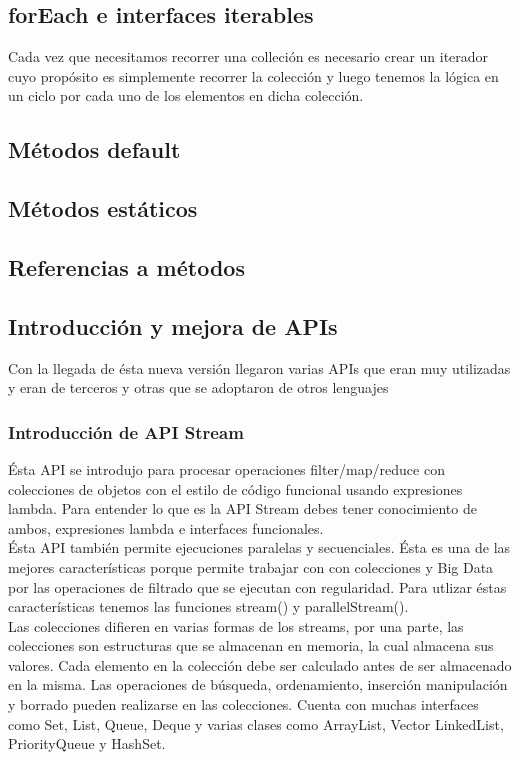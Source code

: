 \documentclass[12pt,article,oneside]{memoir}
\begin{document}
			\subsection{forEach e interfaces iterables} 
			Cada vez que necesitamos recorrer una colleci\'on es necesario crear un iterador cuyo prop\'osito es simplemente 
			recorrer la colecci\'on y luego tenemos la l\'ogica en un ciclo por cada uno de los elementos en dicha colecci\'on.
			
			\subsection{M\'etodos default}
			
			\subsection{M\'etodos est\'aticos}
			
			\subsection{Referencias a m\'etodos}
			
			\subsection{Introducci\'on y mejora de APIs}
			Con la llegada de \'esta nueva versi\'on llegaron varias APIs que eran muy utilizadas y eran de terceros y otras
			que se adoptaron de otros lenguajes
				\subsubsection{Introducci\'on de API Stream}
				\'Esta API se introdujo para procesar operaciones filter/map/reduce con colecciones de objetos con el estilo 
				de c\'odigo funcional usando expresiones lambda. Para entender lo  que es la API Stream debes tener conocimiento 
				de ambos, expresiones lambda e interfaces funcionales.\\
				
				\'Esta API tambi\'en permite ejecuciones paralelas y secuenciales. \'Esta es una de las mejores caracter\'isticas 
				porque permite trabajar con con colecciones y Big Data por las operaciones de filtrado que se ejecutan con 
				regularidad. Para utlizar \'estas caracter\'isticas tenemos las funciones stream() y parallelStream().\\
				
				Las colecciones difieren en varias formas de los streams, por una parte, las colecciones son estructuras que se 
				almacenan en memoria, la cual almacena sus valores. Cada elemento en la colecci\'on debe ser calculado antes de 
				ser almacenado en la misma. Las operaciones de b\'usqueda, ordenamiento, inserci\'on manipulaci\'on y borrado 
				pueden realizarse en las colecciones. Cuenta con muchas interfaces como Set, List, Queue, Deque y varias clases 
				como ArrayList, Vector LinkedList, PriorityQueue y HashSet.\\
				
\end{document}
